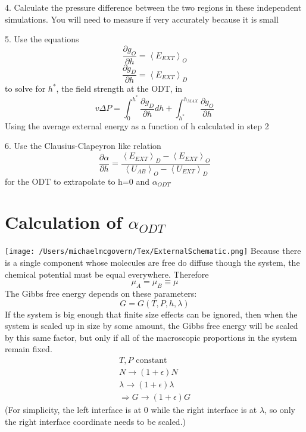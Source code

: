 \documentclass[11pt, oneside]{article}   	%
\begin{document}
4. Calculate the pressure difference between the two regions in these independent simulations. You will need to measure if very accurately because it is small
\vspace{5mm}

5. Use the equations
\begin{equation}
\frac{\partial g_{O}}{\partial h} = \left<E_{EXT}\right>_O
\end{equation}
\begin{equation}
\frac{\partial g_{D}}{\partial h} = \left<E_{EXT}\right>_D
\end{equation}
to solve for $h^*$, the field strength at the ODT, in
\begin{equation}
v\Delta P=\int_{0}^{h^*}\frac{\partial g_{D}}{\partial h}dh + \int_{h^*}^{h_{MAX}}\frac{\partial g_{O}}{\partial h}
\end{equation}
Using the average external energy as a function of h calculated in step 2 
\vspace{5mm}

6. Use the Clausius-Clapeyron like relation
\begin{equation}
\frac{\partial \alpha}{\partial h} = \frac{\left<E_{EXT}\right>_D-\left<E_{EXT}\right>_O}{\left<U_{AB}\right>_O-\left<U_{EXT}\right>_D}
\end{equation}
for the ODT to extrapolate to h=0 and $\alpha_{ODT}$


\section{Calculation of $\alpha_{ODT}$}

\texttt{[image: /Users/michaelmcgovern/Tex/ExternalSchematic.png]}
Because there is a single component whose molecules are free do diffuse though the system, the chemical potential must be equal everywhere. Therefore
\begin{equation}
\mu_A=\mu_B\equiv\mu
\end{equation}
The Gibbs free energy depends on these parameters:
\begin{equation}
G=G(T,P,h,\lambda)
\end{equation}
If the system is big enough that finite size effects can be ignored, then when the system is scaled up in size by some amount, the Gibbs free energy will be scaled by this same factor, but only if all of the macroscopic proportions in the system remain fixed. 
\begin{gather}
T,P \text{ constant}\\
N\rightarrow (1+\epsilon)N\\
\lambda \rightarrow (1+\epsilon)\lambda \\
\Rightarrow G\rightarrow (1+\epsilon)G
\end{gather}
(For simplicity, the left interface is at 0 while the right interface is at $\lambda$, so only the right interface coordinate needs to be scaled.)
\end{document}
